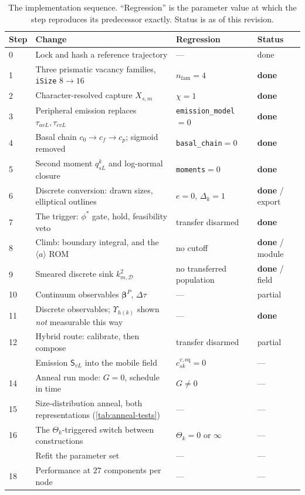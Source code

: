 \documentclass{article}
\newcommand{\spvec}[1]{\bm{\mathsf{#1}}}   %
\newcommand{\aloop}{\ensuremath{\langle a\rangle}}
\newcommand{\code}[1]{\texttt{#1}}
\begin{document}
\begin{table}[htbp]
\centering
\small
\caption{The implementation sequence. ``Regression'' is the parameter value at
which the step reproduces its predecessor exactly. Status is as of this
revision.}
\label{tab:plan}
\begin{tabularx}{\textwidth}{@{}l X l l@{}}
\toprule
Step & Change & Regression & Status \\
\midrule
0 & Lock and hash a reference trajectory & --- & done \\
1 & Three prismatic vacancy families, \texttt{iSize} $8\to16$ &
    $n_{\mathrm{fam}}=4$ & \textbf{done} \\
2 & Character-resolved capture $X_{s,m}$ & $\chi=1$ & \textbf{done} \\
3 & Peripheral emission replaces $\tau_{avL},\tau_{cvL}$ &
    \texttt{emission\_model}$=0$ & \textbf{done} \\
4 & Basal chain $c_0\to c_f\to c_p$; sigmoid removed &
    \code{basal\_chain}$=0$ & \textbf{done} \\
5 & Second moment $q^k_{sL}$ and log-normal closure &
    \code{moments}$=0$ & \textbf{done} \\
6 & Discrete conversion: drawn sizes, elliptical outlines &
    $e=0$, $\Delta_k=1$ & \textbf{done} / export \\
7 & The trigger: $\phi^\ast$ gate, hold, feasibility veto &
    transfer disarmed & \textbf{done} \\
8 & Climb: boundary integral, and the \aloop{} ROM &
    no cutoff & \textbf{done} / module \\
9 & Smeared discrete sink $k^{2}_{m,\mathcal D}$ &
    no transferred population & \textbf{done} / field \\
10 & Continuum observables $\bm\beta^{P}$, $\Delta\tau$ &
    --- & partial \\
11 & Discrete observables; $\Upsilon_{h(k)}$ shown \emph{not} measurable this way &
    --- & \textbf{done} \\
12 & Hybrid route: calibrate, then compose &
    transfer disarmed & partial \\
\addlinespace
13 & Emission $\spvec S_{vL}$ into the mobile field &
    $c^{v,\mathrm{eq}}_{sk}=0$ & --- \\
14 & Anneal run mode: $G=0$, schedule in time &
    $G\neq0$ & --- \\
15 & Size-distribution anneal, both representations
     (\cref{tab:anneal-tests}) & --- & --- \\
16 & The $\Theta_k$-triggered switch between constructions &
    $\Theta_k=0$ or $\infty$ & --- \\
\addlinespace
17 & Refit the parameter set & --- & --- \\
18 & Performance at $27$ components per node & --- & --- \\
\bottomrule
\end{tabularx}
\end{table}
\end{document}
